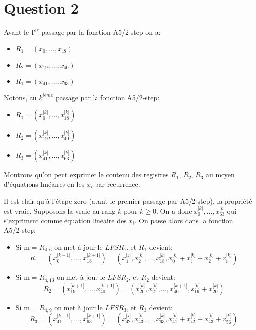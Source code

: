 \section{Question 2}


Avant le $1^{er}$ passage par la fonction A5/2-step on a: 
\begin{itemize}
\item $R_1 = (x_0, \ldots, x_{18})$
\item $R_2 = (x_{19}, \ldots, x_{40})$
\item $R_1 = (x_{41}, \ldots, x_{63})$
\end{itemize}

Notons, au $k^{ième}$ passage par la fonction A5/2-step:
\begin{itemize}
\item $R_1 = (x^{\lbrack k\rbrack}_0, \ldots, x^{\lbrack k \rbrack}_{18})$
\item $R_2 = (x^{\lbrack k \rbrack}_{19}, \ldots, x^{\lbrack k \rbrack}_{40})$
\item $R_3 = (x^{\lbrack k \rbrack}_{41}, \ldots, x^{\lbrack k \rbrack}_{63})$
\end{itemize}

Montrons qu'on peut exprimer le contenu des registres $R_1$, $R_2$, $R_3$ au moyen d'équations linéaires en les $x_i$ par récurrence.

Il est clair qu'à l'étape zero (avant le premier passage par A5/2-step), la propriété est vraie.
Supposons la vraie au rang $k$ pour $k \geq 0$.
On a donc $x^{\lbrack k\rbrack}_0, \ldots, x^{\lbrack k \rbrack}_{63}$ qui s'expriment comme équation linéaire des $x_i$.
On passe alors dans la fonction A5/2-step:
\begin{itemize}
\item Si m = $R_{4,6}$ on met à jour le $LFSR_1$, et $R_1$ devient:
$$R_1 = (x^{\lbrack k+1\rbrack}_0, \ldots, x^{\lbrack k+1 \rbrack}_{18}) = (x^{\lbrack k\rbrack}_1, x^{\lbrack k\rbrack}_2, \ldots, x^{\lbrack k \rbrack}_{18}, x^{\lbrack k\rbrack}_0 + x^{\lbrack k\rbrack}_1 + x^{\lbrack k\rbrack}_2 + x^{\lbrack k\rbrack}_5)$$
\item Si m = $R_{4,13}$ on met à jour le $LFSR_2$, et $R_2$ devient:
$$R_2 = (x^{\lbrack k+1\rbrack}_{19}, \ldots, x^{\lbrack k+1 \rbrack}_{40}) = (x^{\lbrack k\rbrack}_{20},x^{\lbrack k\rbrack}_{21}, \ldots, x^{\lbrack k+1 \rbrack}_{40}, x^{\lbrack k\rbrack}_{19} + x^{\lbrack k\rbrack}_{20})$$
\item Si m = $R_{4,9}$ on met à jour le $LFSR_3$, et $R_3$ devient:
$$R_3 = (x^{\lbrack k+1\rbrack}_{41}, \ldots, x^{\lbrack k+1 \rbrack}_{63}) = (x^{\lbrack k\rbrack}_{42}, x^{\lbrack k\rbrack}_{43}, \ldots, x^{\lbrack k\rbrack}_{63},x^{\lbrack k\rbrack}_{41} + x^{\lbrack k\rbrack}_{42}+ x^{\lbrack k\rbrack}_{43}+ x^{\lbrack k\rbrack}_{56})$$
\end{itemize}

